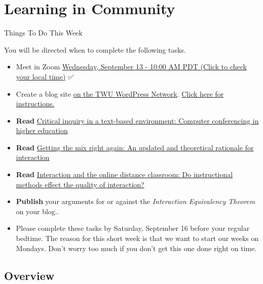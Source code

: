 \documentclass[
]{book}
\providecommand{\tightlist}{%
  \setlength{\itemsep}{0pt}\setlength{\parskip}{0pt}}
\begin{document}
\hypertarget{learning-in-community}{%
\chapter{Learning in Community}\label{learning-in-community}}

\begin{feedback}
{Things To Do This Week}

You will be directed when to complete the following tasks.

\begin{itemize}
\tightlist
\item
  Meet in Zoom \href{https://www.timeanddate.com/worldclock/fixedtime.html?msg=LDRS663+Meeting\&iso=20230913T10\&p1=256\&ah=1}{{Wednesday, September 13 - 10:00 AM PDT }(Click to check your local time)} ✅
\item
  Create a blog site \href{https://create.twu.ca}{on the TWU WordPress Network}. \href{https://ma-lead.github.io/ldrs663/wordpress}{Click here for instructions.}\\
\item
  \textbf{Read} \href{https://www-sciencedirect-com.twu.idm.oclc.org/science/article/pii/S1096751600000166}{Critical inquiry in a text-based environment: Computer conferencing in higher education}\\
\item
  \textbf{Read} \href{http://www.irrodl.org/index.php/irrodl/article/view/149/230}{Getting the mix right again: An updated and theoretical rationale for interaction}\\
\item
  \textbf{Read} \href{https://link-springer-com.ezproxy.student.twu.ca/article/10.1007/s12528-011-9049-4}{Interaction and the online distance classroom: Do instructional methods effect the quality of interaction?}\\
\item
  \textbf{Publish} your arguments for or against the \emph{Interaction Equivalency Theorem} on your blog..\\
\item
  Please complete these tasks by {Saturday, September 16} before your regular bedtime. The reason for this short week is that we want to start our weeks on Mondays. Don't worry too much if you don't get this one done right on time.
\end{itemize}
\end{feedback}

\hypertarget{overview}{%
\section*{Overview}\label{overview}}
\end{document}
